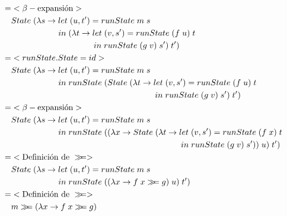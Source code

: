 \documentclass[a4paper]{report}
\newcommand{\bind}{\gg\!\!=}
\begin{document}
\begin{align*}
    = & < \beta -\text{expansi\'on} > \\
    & State\; (\lambda s \to let\; (u,t') = runState\; m\; s \\
    & \hspace{2cm} in\; (\lambda t \to let\; (v,s') = runState\; (f\; u)\; t \\
    & \hspace{3.5cm} in\; runState\; (g\; v)\; s')\; t') \\
    = & < runState . State = id > \\
    & State\; (\lambda s \to let\; (u,t') = runState\; m\; s \\
    & \hspace{2cm} in\; runState\; (State\;
            (\lambda t \to let\; (v,s') = runState\; (f\; u)\; t \\
    & \hspace{6.1cm} in\; runState\; (g\; v)\; s')\; t') \\
    = & < \beta -\text{expansi\'on} > \\
    & State\; (\lambda s \to let\; (u,t') = runState\; m\; s \\
    & \hspace{2cm} in\; runState\; ((\lambda x \to State\;
            (\lambda t \to let\; (v,s') = runState\; (f\; x)\; t \\
    & \hspace{7.2cm} in\; runState\; (g\; v)\; s'))\; u)\; t') \\
    = & <\text{Definici\'on de } \bind > \\
    & State\; (\lambda s \to let\; (u,t') = runState\; m\; s \\
    & \hspace{2cm} in\; runState\; ((\lambda x \to f\; x \bind g)\; u)\; t') \\
    = & <\text{Definici\'on de } \bind > \\
    & m \bind (\lambda x \to f\; x \bind g)
\end{align*}

\pagebreak
\end{document}
